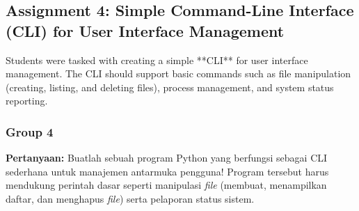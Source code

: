 \documentclass[12pt]{article}
\begin{document}
\subsection{Assignment 4: Simple Command-Line Interface (CLI) for User Interface Management}
Students were tasked with creating a simple **CLI** for user interface management. The CLI should support basic commands such as file manipulation (creating, listing, and deleting files), process management, and system status reporting.
\subsubsection{Group 4}
\noindent \textbf{Pertanyaan: }
Buatlah sebuah program Python yang berfungsi sebagai CLI sederhana untuk manajemen antarmuka pengguna! Program tersebut harus mendukung perintah dasar seperti manipulasi \textit{file} (membuat, menampilkan daftar, dan menghapus \textit{file}) serta pelaporan status sistem. \\
\end{document}
